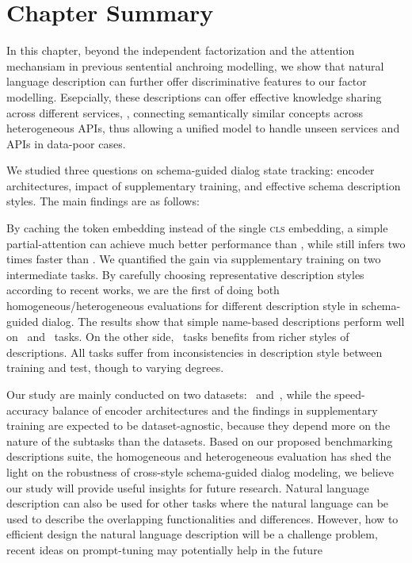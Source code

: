 \section{Chapter Summary}
\label{sec:conclusion}
In this chapter, beyond the independent factorization and the
attention mechansiam in previous sentential anchroing modelling, we
show that natural language description can further offer
discriminative features to our factor modelling. Esepcially, these
descriptions can offer effective knowledge sharing across different
services, \eg, connecting semantically similar concepts across
heterogeneous APIs, thus allowing a unified model to handle unseen
services and APIs in data-poor cases.

We studied three questions on schema-guided dialog state tracking:
encoder architectures, impact of supplementary training, and effective
schema description styles.  The main findings are as follows:

By caching the token embedding instead of the single \textsc{cls}
embedding, a simple partial-attention \FE can achieve much better
performance than \DE, while still infers two times faster than \CE.
We quantified the gain via supplementary training on two intermediate
tasks.  By carefully choosing representative description styles
according to recent works, we are the first of doing both
homogeneous/heterogeneous evaluations for different description style
in schema-guided dialog. The results show that simple name-based
descriptions perform well on \IC~and \RSI~tasks. On the other side, \NSL~tasks
benefits from richer styles of descriptions.  All tasks suffer from
inconsistencies in description style between training and test, though
to varying degrees.

Our study are mainly conducted on two datasets: \sgdst~and~\multiwoz,
while the speed-accuracy balance of encoder architectures and the
findings in supplementary training are expected to be
dataset-agnostic, because they depend more on the nature of the
subtasks than the datasets. Based on our proposed benchmarking
descriptions suite, the homogeneous and heterogeneous evaluation has
shed the light on the robustness of cross-style schema-guided dialog
modeling, we believe our study will provide useful insights for future
research. Natural language description can also be used for other
tasks where the natural language can be used to describe the
overlapping functionalities and differences. However, how to efficient
design the natural language description will be a challenge problem,
recent ideas on prompt-tuning may potentially help in the
future~\citep{schucher2022power,ye2022ontology}



